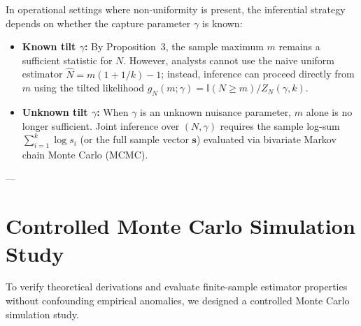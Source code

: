\documentclass[10pt,a4paper]{article}
\begin{document}
In operational settings where non-uniformity is present, the inferential strategy depends on whether the capture parameter $\gamma$ is known:
\begin{itemize}
    \item \textbf{Known tilt $\gamma$:} By Proposition~3, the sample maximum $m$ remains a sufficient statistic for $N$. However, analysts cannot use the naive uniform estimator $\hat{N} = m(1 + 1/k) - 1$; instead, inference can proceed directly from $m$ using the tilted likelihood $g_N(m; \gamma) = \mathbb{I}(N \ge m) / Z_N(\gamma, k)$.
    \item \textbf{Unknown tilt $\gamma$:} When $\gamma$ is an unknown nuisance parameter, $m$ alone is no longer sufficient. Joint inference over $(N, \gamma)$ requires the sample log-sum $\sum_{i=1}^k \log s_i$ (or the full sample vector $\mathbf{s}$) evaluated via bivariate Markov chain Monte Carlo (MCMC).
\end{itemize}

---

\section{Controlled Monte Carlo Simulation Study}

To verify theoretical derivations and evaluate finite-sample estimator properties without confounding empirical anomalies, we designed a controlled Monte Carlo simulation study.
\end{document}
